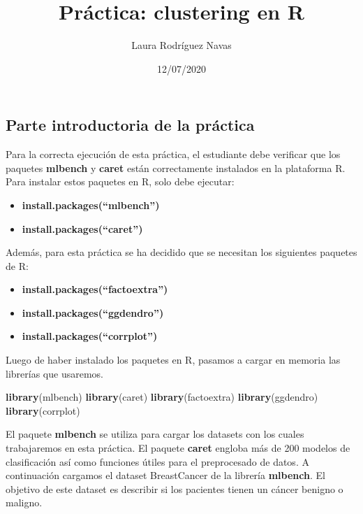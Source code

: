 \documentclass[
]{article}
\title{Práctica: clustering en R}
\author{Laura Rodríguez Navas}
\date{12/07/2020}
\newenvironment{Shaded}{\begin{snugshade}}{\end{snugshade}}
\newcommand{\KeywordTok}[1]{\textcolor[rgb]{0.13,0.29,0.53}{\textbf{#1}}}
\newcommand{\NormalTok}[1]{#1}
\providecommand{\tightlist}{%
  \setlength{\itemsep}{0pt}\setlength{\parskip}{0pt}}
\begin{document}
\maketitle

\hypertarget{parte-introductoria-de-la-pruxe1ctica}{%
\subsection{Parte introductoria de la
práctica}\label{parte-introductoria-de-la-pruxe1ctica}}

Para la correcta ejecución de esta práctica, el estudiante debe
verificar que los paquetes \textbf{mlbench} y \textbf{caret} están
correctamente instalados en la plataforma R. Para instalar estos
paquetes en R, solo debe ejecutar:

\begin{itemize}
\tightlist
\item
  \textbf{install.packages(``mlbench'')}
\item
  \textbf{install.packages(``caret'')}
\end{itemize}

Además, para esta práctica se ha decidido que se necesitan los
siguientes paquetes de R:

\begin{itemize}
\tightlist
\item
  \textbf{install.packages(``factoextra'')}
\item
  \textbf{install.packages(``ggdendro'')}
\item
  \textbf{install.packages(``corrplot'')}
\end{itemize}

Luego de haber instalado los paquetes en R, pasamos a cargar en memoria
las librerías que usaremos.

\begin{Shaded}
\begin{Highlighting}[]
\KeywordTok{library}\NormalTok{(mlbench)}
\KeywordTok{library}\NormalTok{(caret)}
\KeywordTok{library}\NormalTok{(factoextra)}
\KeywordTok{library}\NormalTok{(ggdendro)}
\KeywordTok{library}\NormalTok{(corrplot)}
\end{Highlighting}
\end{Shaded}

El paquete \textbf{mlbench} se utiliza para cargar los datasets con los
cuales trabajaremos en esta práctica. El paquete \textbf{caret} engloba
más de 200 modelos de clasificación así como funciones útiles para el
preprocesado de datos. A continuación cargamos el dataset BreastCancer
de la librería \textbf{mlbench}. El objetivo de este dataset es
describir si los pacientes tienen un cáncer benigno o maligno.
\end{document}

